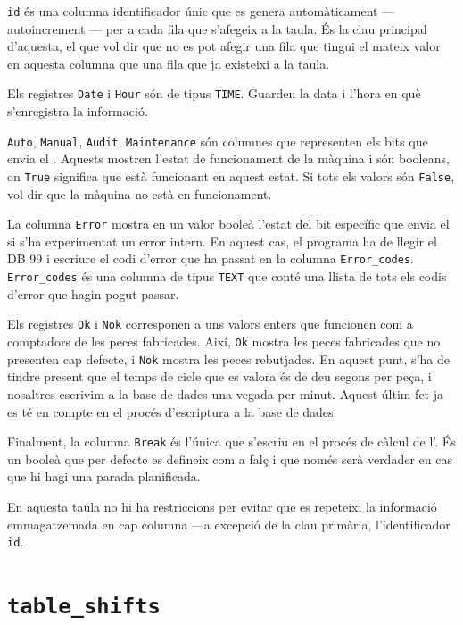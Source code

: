 \documentclass{tfgitic}[2022/06/30]
\begin{document}
\texttt{id} és una columna identificador únic que es genera automàticament --- autoincrement --- per a cada fila que s'afegeix a la taula. És la clau principal d'aquesta, el que vol dir que no es pot afegir una fila que tingui el mateix valor en aquesta columna que una fila que ja existeixi a la taula.

Els registres \texttt{Date} i \texttt{Hour} són de tipus \texttt{TIME}. Guarden la data i l'hora en què s'enregistra la informació.

\texttt{Auto}, \texttt{Manual}, \texttt{Audit}, \texttt{Maintenance} són columnes que representen els bits que envia el . Aquests mostren l'estat de funcionament de la màquina i són booleans, on \texttt{True} significa que està funcionant en aquest estat. Si tots els valors són \texttt{False}, vol dir que la màquina no està en funcionament.

La columna \texttt{Error} mostra en un valor booleà l'estat del bit específic que envia el  si s'ha experimentat un error intern. En aquest cas, el programa ha de llegir el DB 99 i escriure el codi d'error que ha passat en la columna \texttt{Error\_codes}. \texttt{Error\_codes} és una columna de tipus \texttt{TEXT} que conté una llista de tots els codis d'error que hagin pogut passar.

Els registres \texttt{Ok} i \texttt{Nok} corresponen a uns valors enters que funcionen com a comptadors de les peces fabricades. Així, \texttt{Ok} mostra les peces fabricades que no presenten cap defecte, i \texttt{Nok} mostra les peces rebutjades. En aquest punt, s'ha de tindre present que el temps de cicle que es valora és de deu segons per peça, i nosaltres escrivim a la base de dades una vegada per minut. Aquest últim fet ja es té en compte en el procés d'escriptura a la base de dades.

Finalment, la columna \texttt{Break} és l'única que s'escriu en el procés de càlcul de l'. És un booleà que per defecte es defineix com a falç i que només serà verdader en cas que hi hagi una parada planificada.

En aquesta taula no hi ha restriccions per evitar que es repeteixi la informació emmagatzemada en cap columna ---a excepció de la clau primària, l'identificador \texttt{id}.

\section{\texttt{table\_shifts}}
\end{document}
